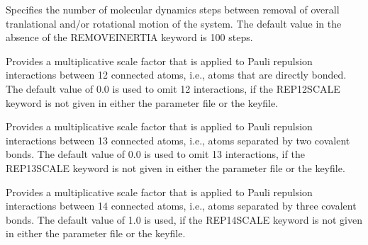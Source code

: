 \documentclass[letterpaper,11pt,english]{sphinxmanual}
\begin{document}
\ignorespaces {}\label{\detokenize{text/keywords:key-remove-inertia}}\begin{description}
\sphinxAtStartPar
Specifies the number of molecular dynamics steps between removal of overall tranlational and/or rotational motion of the system. The default value in the absence of the REMOVE\sphinxhyphen{}INERTIA keyword is 100 steps.

\end{description}

\ignorespaces {}\label{\detokenize{text/keywords:key-rep-12-scale}}\begin{description}
\sphinxAtStartPar
Provides a multiplicative scale factor that is applied to Pauli repulsion interactions between 1\sphinxhyphen{}2 connected atoms, i.e., atoms that are directly bonded. The default value of 0.0 is used to omit 1\sphinxhyphen{}2 interactions, if the REP\sphinxhyphen{}12\sphinxhyphen{}SCALE keyword is not given in either the parameter file or the keyfile.

\end{description}

\ignorespaces {}\label{\detokenize{text/keywords:key-rep-13-scale}}\begin{description}
\sphinxAtStartPar
Provides a multiplicative scale factor that is applied to Pauli repulsion interactions between 1\sphinxhyphen{}3 connected atoms, i.e., atoms separated by two covalent bonds. The default value of 0.0 is used to omit 1\sphinxhyphen{}3 interactions, if the REP\sphinxhyphen{}13\sphinxhyphen{}SCALE keyword is not given in either the parameter file or the keyfile.

\end{description}

\ignorespaces {}\label{\detokenize{text/keywords:key-rep-14-scale}}\begin{description}
\sphinxAtStartPar
Provides a multiplicative scale factor that is applied to Pauli repulsion interactions between 1\sphinxhyphen{}4 connected atoms, i.e., atoms separated by three covalent bonds. The default value of 1.0 is used, if the REP\sphinxhyphen{}14\sphinxhyphen{}SCALE keyword is not given in either the parameter file or the keyfile.

\end{description}
\end{document}
